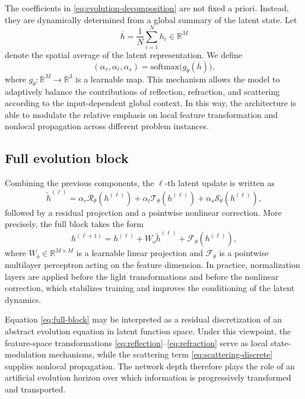 \documentclass{article}
\begin{document}
The coefficients in \eqref{eq:evolution-decomposition} are not fixed a priori. Instead, they are dynamically determined from a global summary of the latent state. Let
\begin{equation}
\overline{h}
=
\frac{1}{N}
\sum_{i=1}^N h_i
\in \mathbb{R}^M
\label{eq:global-pooling}
\end{equation}
denote the spatial average of the latent representation. We define
\begin{equation}
(\alpha_r,\alpha_t,\alpha_s)
=
\mathrm{softmax}\!\bigl(g_\theta(\overline{h})\bigr),
\label{eq:adaptive-weights}
\end{equation}
where $g_\theta : \mathbb{R}^M \to \mathbb{R}^3$ is a learnable map. This mechanism allows the model to adaptively balance the contributions of reflection, refraction, and scattering according to the input-dependent global context. In this way, the architecture is able to modulate the relative emphasis on local feature transformation and nonlocal propagation across different problem instances.

\subsection{Full evolution block}

Combining the previous components, the $\ell$-th latent update is written as
\begin{equation}
\widetilde{h}^{(\ell)}
=
\alpha_r \mathcal{R}_\theta(h^{(\ell)})
+
\alpha_t \mathcal{T}_\theta(h^{(\ell)})
+
\alpha_s \mathcal{S}_\theta(h^{(\ell)}),
\label{eq:mixture}
\end{equation}
followed by a residual projection and a pointwise nonlinear correction. More precisely, the full block takes the form
\begin{equation}
h^{(\ell+1)}
=
h^{(\ell)}
+
W_o \widetilde{h}^{(\ell)}
+
\mathcal{F}_\theta(h^{(\ell)}),
\label{eq:full-block}
\end{equation}
where $W_o \in \mathbb{R}^{M \times M}$ is a learnable linear projection and $\mathcal{F}_\theta$ is a pointwise multilayer perceptron acting on the feature dimension. In practice, normalization layers are applied before the light transformations and before the nonlinear correction, which stabilizes training and improves the conditioning of the latent dynamics.

Equation \eqref{eq:full-block} may be interpreted as a residual discretization of an abstract evolution equation in latent function space. Under this viewpoint, the feature-space transformations \eqref{eq:reflection}--\eqref{eq:refraction} serve as local state-modulation mechanisms, while the scattering term \eqref{eq:scattering-discrete} supplies nonlocal propagation. The network depth therefore plays the role of an artificial evolution horizon over which information is progressively transformed and transported.
\end{document}
